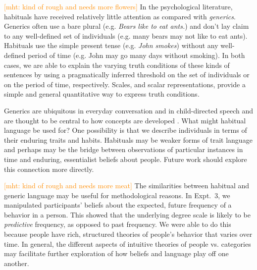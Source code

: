 \documentclass[10pt,letterpaper]{article}
\newcommand{\mht}[1]{\textcolor{DarkOrange}{[mht: #1]}}
\begin{document}
\mht{kind of rough and needs more flowers}
In the psychological literature, habituals have received relatively little attention as compared with \emph{generics}. 
Generics often use a bare plural (e.g. \emph{Bears like to eat ants.}) and don't lay claim to any well-defined set of individuals (e.g. many bears may not like to eat ants).
Habituals use the simple present tense (e.g. \emph{John smokes}) without any well-defined period of time (e.g. John may go many days without smoking). 
In both cases, we are able to explain the varying truth conditions of these kinds of sentences by using a pragmatically inferred threshold on the set of individuals or on the period of time, respectively. 
Scales, and scalar representations, provide a simple and general quantitative way to express truth conditions.

Generics are ubiquitous in everyday conversation and in child-directed speech \cite{Gelman2008} and are thought to be central to how concepts are developed \cite{Gelman2004}.
What might habitual language be used for?
One possibility is that we describe individuals in terms of their enduring traits and habits. 
Habituals may be weaker forms of trait language \cite{Gelman1999} and perhaps may be the bridge between observations of particular instances in time and enduring, essentialist beliefs about people.
Future work should explore this connection more directly.
	
\mht{kind of rough and needs more meat}
The similarities between habitual and generic language may be useful for methodological reasons. 
In Expt.~3, we manipulated participants' beliefs about the expected, future frequency of a behavior in a person.
This showed that the underlying degree scale is likely to be \emph{predictive} frequency, as opposed to past frequency. 
We were able to do this because people have rich, structured theories of people's behavior that varies over time. 
In general, the different aspects of intuitive theories of people vs. categories may facilitate further exploration of how beliefs and language play off one another.


%
\end{document}
